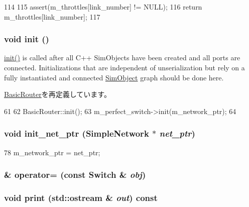 \begin{DoxyCode}
114 {
115     assert(m_throttles[link_number] != NULL);
116     return m_throttles[link_number];
117 }
\end{DoxyCode}
\hypertarget{classSwitch_a02fd73d861ef2e4aabb38c0c9ff82947}{
\subsubsection[{init}]{\setlength{\rightskip}{0pt plus 5cm}void init ()}}
\label{classSwitch_a02fd73d861ef2e4aabb38c0c9ff82947}
\hyperlink{classSwitch_a02fd73d861ef2e4aabb38c0c9ff82947}{init()} is called after all C++ SimObjects have been created and all ports are connected. Initializations that are independent of unserialization but rely on a fully instantiated and connected \hyperlink{classSimObject}{SimObject} graph should be done here. 

\hyperlink{classBasicRouter_a02fd73d861ef2e4aabb38c0c9ff82947}{BasicRouter}を再定義しています。


\begin{DoxyCode}
61 {
62     BasicRouter::init();
63     m_perfect_switch->init(m_network_ptr);
64 }
\end{DoxyCode}
\hypertarget{classSwitch_aa5fa44fb9951e0d6308b8dd146a10dfa}{
\subsubsection[{init\_\-net\_\-ptr}]{\setlength{\rightskip}{0pt plus 5cm}void init\_\-net\_\-ptr ({\bf SimpleNetwork} $\ast$ {\em net\_\-ptr})}}
\label{classSwitch_aa5fa44fb9951e0d6308b8dd146a10dfa}



\begin{DoxyCode}
78 { m_network_ptr = net_ptr; }
\end{DoxyCode}
\hypertarget{classSwitch_a91e7e0dd3e09defd46617999ca7293dc}{
\subsubsection[{operator=}]{\& operator= (const {\bf Switch} \& {\em obj})}}
\label{classSwitch_a91e7e0dd3e09defd46617999ca7293dc}
\hypertarget{classSwitch_ac55fe386a101fbae38c716067c9966a0}{
\subsubsection[{print}]{\setlength{\rightskip}{0pt plus 5cm}void print (std::ostream \& {\em out}) const}}
\label{classSwitch_ac55fe386a101fbae38c716067c9966a0}


